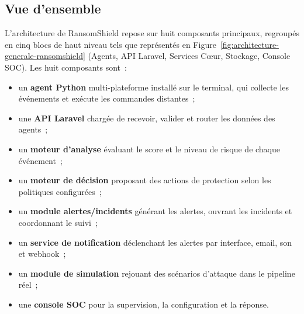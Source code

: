 \subsection{Vue d'ensemble}

L'architecture de RansomShield repose sur huit composants principaux, regroupés en cinq blocs de haut niveau tels que représentés en Figure~\ref{fig:architecture-generale-ransomshield} (Agents, API Laravel, Services C\oe{}ur, Stockage, Console SOC). Les huit composants sont~:

\begin{itemize}
    \item un \textbf{agent Python} multi-plateforme installé sur le terminal, qui collecte les événements et exécute les commandes distantes~;
    \item une \textbf{API Laravel} chargée de recevoir, valider et router les données des agents~;
    \item un \textbf{moteur d'analyse} évaluant le score et le niveau de risque de chaque événement~;
    \item un \textbf{moteur de décision} proposant des actions de protection selon les politiques configurées~;
    \item un \textbf{module alertes/incidents} générant les alertes, ouvrant les incidents et coordonnant le suivi~;
    \item un \textbf{service de notification} déclenchant les alertes par interface, email, son et webhook~;
    \item un \textbf{module de simulation} rejouant des scénarios d'attaque dans le pipeline réel~;
    \item une \textbf{console SOC} pour la supervision, la configuration et la réponse.
\end{itemize}


